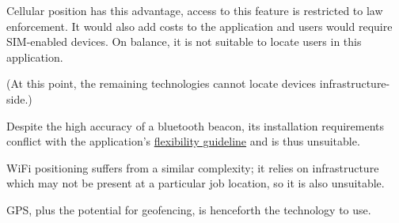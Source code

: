Cellular position has this advantage, access to this
feature is restricted to law enforcement.
It would also add costs to the application and
\projectname{} users would require SIM-enabled devices.
On balance, it is not suitable to locate users in this
application.

(At this point, the remaining technologies cannot locate
devices infrastructure-side.)

Despite the high accuracy of a bluetooth beacon, its
installation requirements conflict with the application's
\hyperref[ss:goal]{flexibility guideline} and is thus
unsuitable.

WiFi positioning suffers from a similar complexity; it
relies on infrastructure which may not be present at a
particular job location, so it is also unsuitable.

GPS, plus the potential for geofencing, is henceforth the
technology to use.
